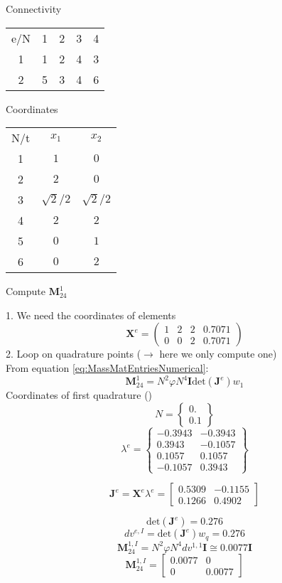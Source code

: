 \documentclass[10pt,a4paper]{article}
\begin{document}

Connectivity
\begin{tabular}{c | c | c | c | c}
e/N& 1 & 2 & 3 & 4 \\
1 & 1 & 2 & 4 & 3 \\
2 & 5 & 3 & 4 & 6
\end{tabular}

Coordinates
\begin{tabular}{c | c | c}
N/t & $x_1$ & $x_2$ \\
1 & $1$ & $0$ \\
2 & $2$ & $0$ \\
3 & $\sqrt{2}/2$ & $\sqrt{2}/2$ \\
4 & $2$ & $2$ \\
5 & $0$ & $1$ \\
6 & $0$ & $2$
\end{tabular}

Compute $\bm M_{24}^1$

1. We need the coordinates of elements
\[ \bm X^e = 
\begin{pmatrix}
1 & 2 & 2 & 0.7071 \\
0 & 0 & 2 & 0.7071
\end{pmatrix} \] %
2. Loop on quadrature points ($\rightarrow$ here we only compute one) \\
From equation \ref{eq:MassMatEntriesNumerical}:
\[ \bm M_{24}^1 = N^2 \varphi N^4 \bm I \text{det}(\bm J^e) w_1 \]
Coordinates of first quadrature ()%
\[ N = \begin{Bmatrix}
0. \\ 0.1
\end{Bmatrix} \]
\[ \lambda^e = \begin{Bmatrix}
-0.3943 & -0.3943 \\
 0.3943 & -0.1057 \\
 0.1057 &  0.1057 \\
-0.1057 &  0.3943
\end{Bmatrix} \]

\[ \bm J^e = \bm X^e \lambda^e = \begin{bmatrix}
0.5309 & -0.1155 \\
0.1266 &  0.4902
\end{bmatrix} \]

\[ \text{det}(\bm J^e) = 0.276 \]
\[ dv^{e, I} = \text{det}(\bm J^e) w_q = 0.276 \]
\[ \bm M_{24}^{1, I} = N^2 \varphi N^4 dv^{1,1} \bm I \cong 0.0077 \bm I \]
\[ \bm M_{24}^{1, I} = \begin{bmatrix}
0.0077 & 0 \\
0 & 0.0077
\end{bmatrix} \]
\end{document}
